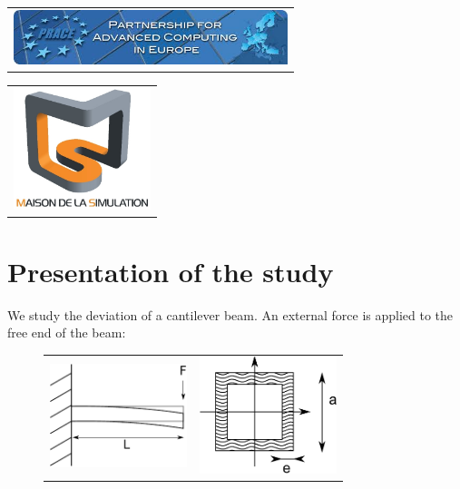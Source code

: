 \documentclass[11pt, french, A4wide]{article}
\theoremstyle{remark}
\theoremstyle{definition}
\begin{document}
\begin{minipage}{8cm}
  \begin{center}
    \begin{tabular}{c}
			\includegraphics[width=8cm]{Prace_long.jpg}
    \end{tabular}
  \end{center}
\end{minipage}
\hfill
\begin{minipage}{8cm}
  \begin{center}
    \begin{tabular}{c}
				\includegraphics[width=4cm]{logo_MDS.jpg}
    \end{tabular}
  \end{center}
\end{minipage}


\newpage
\section{Presentation of the study}

We study the deviation of a cantilever beam. An external force is applied to the free end of the beam:

\begin{figure}[htbp]
  \begin{center}
    \begin{tabular}{cc}
\includegraphics[width=4cm]{poutre.pdf}
&
\includegraphics[width=4cm]{section.pdf}
    \end{tabular}
  \end{center}
\end{figure}
\end{document}
